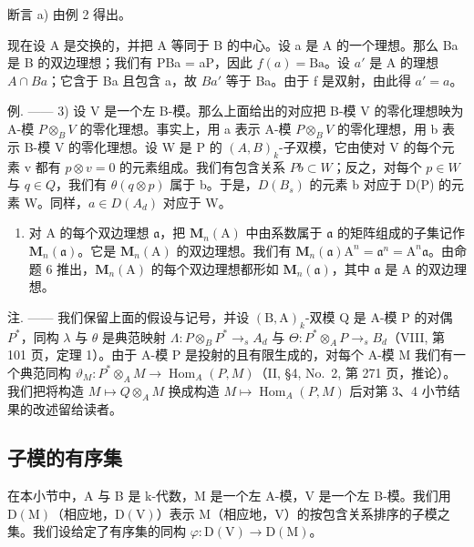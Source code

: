 断言 a) 由例 2 得出。

现在设 A 是交换的，并把 A 等同于 B 的中心。设 a 是 A 的一个理想。那么 Ba 是 B 的双边理想；我们有 PBa = aP，因此 \(f(a) = \text{Ba}\)。设 \(a'\) 是 A 的理想 \(A \cap Ba\)；它含于 Ba 且包含 a，故 \(Ba'\) 等于 Ba。由于 f 是双射，由此得 \(a' = a\)。

例. —— 3) 设 V 是一个左 B-模。那么上面给出的对应把 B-模 V 的零化理想映为 A-模 \(P \otimes_{B} V\) 的零化理想。事实上，用 a 表示 A-模 \(P \otimes_{B} V\) 的零化理想，用 b 表示 B-模 V 的零化理想。设 W 是 P 的 \((A, B)_{k}\)-子双模，它由使对 V 的每个元素 v 都有 \(p \otimes v = 0\) 的元素组成。我们有包含关系 \(Pb \subset W\)；反之，对每个 \(p \in W\) 与 \(q \in Q\)，我们有 \(\theta(q \otimes p)\) 属于 b。于是，\(D(B_s)\) 的元素 b 对应于 D(P) 的元素 W。同样，\(a \in D(A_d)\) 对应于 W。

\begin{enumerate}
\def\labelenumi{\arabic{enumi})}
\setcounter{enumi}{3}
\tightlist
\item
  对 A 的每个双边理想 \(\mathfrak{a}\)，把 \(\mathbf{M}_n(\mathrm{A})\) 中由系数属于 \(\mathfrak{a}\) 的矩阵组成的子集记作 \(\mathbf{M}_n(\mathfrak{a})\)。它是 \(\mathbf{M}_n(\mathrm{A})\) 的双边理想。我们有 \(\mathbf{M}_n(\mathfrak{a})\mathrm{A}^n = \mathfrak{a}^n = \mathrm{A}^n\mathfrak{a}\)。由命题 6 推出，\(\mathbf{M}_n(\mathrm{A})\) 的每个双边理想都形如 \(\mathbf{M}_n(\mathfrak{a})\)，其中 \(\mathfrak{a}\) 是 A 的双边理想。
\end{enumerate}

注. —— 我们保留上面的假设与记号，并设 \((\mathrm{B},\mathrm{A})_{k}\)-双模 Q 是 A-模 P 的对偶 \(P^{*}\)，同构 \(\lambda\) 与 \(\theta\) 是典范映射 \(\Lambda:P\otimes_{B}P^{*}\to_{s}A_{d}\) 与 \(\Theta:P^{*}\otimes_{A}P\to_{s}B_{d}\)（VIII, 第 101 页，定理 1）。由于 A-模 P 是投射的且有限生成的，对每个 A-模 M 我们有一个典范同构 \(\vartheta_{M}:P^{*}\otimes_{A}M\to\operatorname{Hom}_{A}(P,M)\)（II, §4, No.~2, 第 271 页，推论）。我们把将构造 \(M\mapsto Q\otimes_{A}M\) 换成构造 \(M\mapsto\operatorname{Hom}_{A}(P,M)\) 后对第 3、4 小节结果的改述留给读者。

\subsection{子模的有序集}

在本小节中，A 与 B 是 k-代数，M 是一个左 A-模，V 是一个左 B-模。我们用 \(\mathrm{D}(\mathrm{M})\)（相应地，\(\mathrm{D}(\mathrm{V})\)）表示 M（相应地，V）的按包含关系排序的子模之集。我们设给定了有序集的同构 \(\varphi : \mathrm{D}(\mathrm{V}) \to \mathrm{D}(\mathrm{M})\)。

